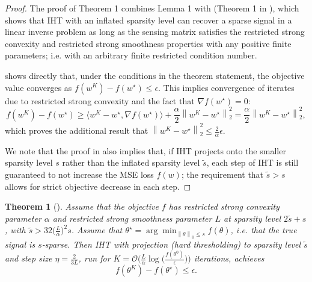 \documentclass{article} %
\newcommand{\zeronorm}[1]{\left\|#1\right\|_{0}}
\newcommand{\twonorm}[1]{\left\|#1\right\|_{2}}
\newcommand{\w}{\ensuremath{w}}
\newtheorem{theorem}{Theorem}
\newcommand{\1}{\ensuremath{{\sf (i)}}}
\newcommand{\2}{\ensuremath{{\sf (ii)}}}
\newcommand{\3}{\ensuremath{{\sf (iii)}}}
\newcommand{\4}{\ensuremath{{\sf (iv)}}}
\newcommand{\5}{\ensuremath{{\sf (v)}}}
\newcommand{\6}{\ensuremath{{\sf (vi)}}}
\begin{document}
 \begin{proof}
        The proof of Theorem 1 combines Lemma 1 with  (Theorem 1 in \citet{jain2014iterative}), which shows that IHT with an inflated sparsity level can recover a sparse signal in a linear inverse problem as long as the sensing matrix satisfies the restricted strong convexity and restricted strong smoothness properties with any positive finite parameters; i.e. with an arbitrary finite restricted condition number. 

         shows directly that, under the conditions in the theorem statement, the objective value converges as $f(\w^K) - f(\w^\star) \leq \epsilon$. This implies convergence of iterates due to restricted strong convexity and the fact that $\nabla f(\w^\star) = 0$:
        \begin{equation*}
            f(\w^K) - f(\w^\star) \geq \langle \w^K - \w^\star, \nabla f(\w^\star)\rangle + \frac{\alpha}{2}\twonorm{\w^K - \w^\star}^2 = \frac{\alpha}{2}\twonorm{\w^K - \w^\star}^2 ,
        \end{equation*}
        which proves the additional result that $\twonorm{\w^K - \w^\star}^2 \leq \frac{2}{\alpha}\epsilon$.
        
        We note that the proof in \citet{jain2014iterative} also implies that, if IHT projects onto the smaller sparsity level $s$ rather than the inflated sparsity level $\tilde s$, each step of IHT is still guaranteed to not increase the MSE loss $f(\w)$; the requirement that $\tilde s > s$ allows for strict objective decrease in each step.
    \end{proof}
\begin{theorem}[\citet{jain2014iterative}]\label{thm:fromjain}
    Assume that the objective $f$ has restricted strong convexity parameter $\alpha$ and restricted strong smoothness parameter $L$ at sparsity level $2\tilde s+s$, with $\tilde s > 32\big(\frac{L}{\alpha}\big)^2s$. Assume that $\theta^\star = \arg\min_{\zeronorm{\theta}\leq s}f(\theta)$, i.e. that the true signal is $s$-sparse. Then IHT with projection (hard thresholding) to sparsity level $\tilde s$ and step size $\eta = \frac{2}{3L}$, run for $K = \mathcal{O}\big( \frac{L}{\alpha}\log\big( \frac{f(\theta^0)}{\epsilon} \big) \big)$ iterations, achieves
    \begin{equation*}
        f(\theta^K) - f(\theta^\star) \leq \epsilon .
    \end{equation*}
\end{theorem}
\end{document}
